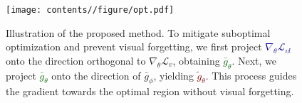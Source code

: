 
\begin{figure}[t]
    \centering
    \texttt{[image: contents//figure/opt.pdf]}
    \caption{Illustration of the proposed method. To mitigate suboptimal optimization and prevent visual forgetting, we first project \textcolor{darkblue}{\( \nabla_{\theta} \mathcal{L}_{vl} \)} onto the direction orthogonal to \( \nabla_{\theta} \mathcal{L}_{v} \), obtaining \textcolor{darkgreen}{\( \bar{g}_{\theta} \)}. Next, we project \textcolor{darkgreen}{\( \bar{g}_{\theta} \)} onto the direction of \( \bar{g}_\phi \), yielding \textcolor{darkred}{\( \tilde{g}_\theta \)}. This process guides the gradient towards the optimal region without visual forgetting.
    }
    \label{fig:opt}
    \vspace{-1em}
\end{figure}
